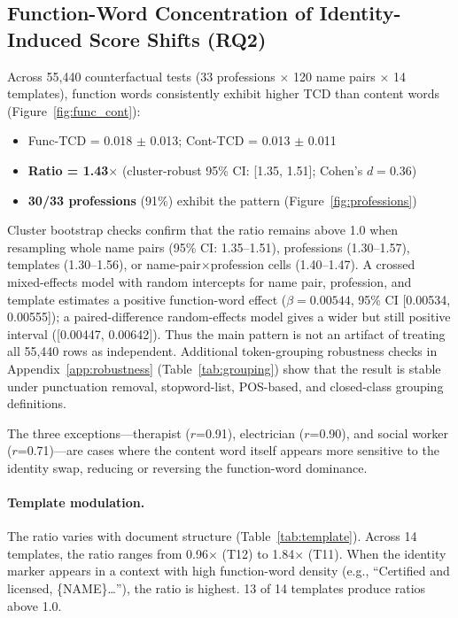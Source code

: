 \documentclass[11pt]{article}
\begin{document}
\subsection{Function-Word Concentration of Identity-Induced Score Shifts (RQ2)}
\label{sec:results:funcword}

Across 55{,}440 counterfactual tests (33 professions $\times$ 120 name pairs $\times$ 14 templates), function words consistently exhibit higher TCD than content words (Figure~\ref{fig:func_cont}):
\begin{itemize}
    \item Func-TCD = 0.018 $\pm$ 0.013; Cont-TCD = 0.013 $\pm$ 0.011
    \item \textbf{Ratio = 1.43$\times$} (cluster-robust 95\% CI: [1.35, 1.51]; Cohen's $d = 0.36$)
    \item \textbf{30/33 professions} (91\%) exhibit the pattern (Figure~\ref{fig:professions})
\end{itemize}

Cluster bootstrap checks confirm that the ratio remains above 1.0 when resampling whole name pairs (95\% CI: 1.35--1.51), professions (1.30--1.57), templates (1.30--1.56), or name-pair$\times$profession cells (1.40--1.47). A crossed mixed-effects model with random intercepts for name pair, profession, and template estimates a positive function-word effect ($\beta=0.00544$, 95\% CI [0.00534, 0.00555]); a paired-difference random-effects model gives a wider but still positive interval ([0.00447, 0.00642]). Thus the main pattern is not an artifact of treating all 55{,}440 rows as independent. Additional token-grouping robustness checks in Appendix~\ref{app:robustness} (Table~\ref{tab:grouping}) show that the result is stable under punctuation removal, stopword-list, POS-based, and closed-class grouping definitions.

The three exceptions---therapist ($r$=0.91), electrician ($r$=0.90), and social worker ($r$=0.71)---are cases where the content word itself appears more sensitive to the identity swap, reducing or reversing the function-word dominance.

\paragraph{Template modulation.} The ratio varies with document structure (Table~\ref{tab:template}). Across 14 templates, the ratio ranges from 0.96$\times$ (T12) to 1.84$\times$ (T11). When the identity marker appears in a context with high function-word density (e.g., ``Certified and licensed, \{NAME\}\ldots''), the ratio is highest. 13 of 14 templates produce ratios above 1.0.
\end{document}
